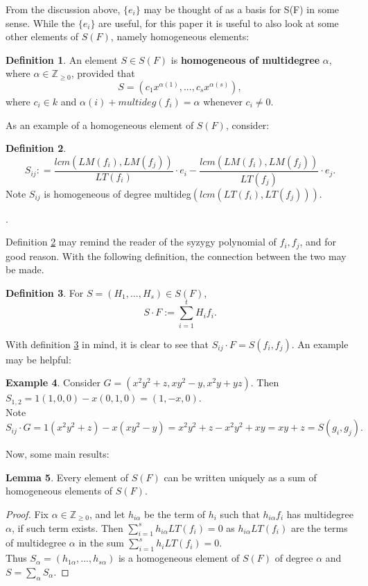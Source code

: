 \documentclass[reqno]{amsart}
\theoremstyle{definition}
\newtheorem{lem}{Lemma}
\theoremstyle{definition}
\newtheorem{defn}[lem]{Definition}
\newtheorem{ex}[lem]{Example}
\begin{document}
From the discussion above, $\{e_i\}$ may be thought of as a basis for S(F) in some sense. While the $\{e_i\}$ are useful, for this paper it is useful to also look at some other elements of $S(F)$, namely homogeneous elements: 

\begin{defn}
An element $S\in S(F)$ is \textbf{homogeneous of multidegree} $\alpha$, where $\alpha \in \mathbb{Z}_{\geq0}$, provided that $$S = (c_1x^{\alpha(1)}, ..., c_sx^{\alpha(s)}),$$ where $c_i\in k$ and $\alpha(i) + multideg(f_i) = \alpha$ whenever $c_i\neq 0$. 
\end{defn}

As an example of a homogeneous element of $S(F)$, consider: 

\begin{defn}\label{sij}
$$S_{ij} : = \frac{lcm(LM(f_i),LM(f_j))}{LT(f_i)}\cdot \textbf{$e_i$} - \frac{lcm(LM(f_i),LM(f_j))}{LT(f_j)}\cdot \textbf{$e_j$}. $$ Note $S_{ij}$ is homogeneous of degree multideg$(lcm(LT(f_i),LT(f_j)))$.
\end{defn}.

Definition \ref{sij} may remind the reader of the syzygy polynomial of $f_i,f_j$, and for good reason. With the following definition, the connection between the two may be made. 

\begin{defn}\label{sdotf}
For $S = (H_1,...,H_s)\in S(F)$, 
$$S\cdot F := \sum_{i = 1}^t H_if_i.$$
\end{defn}

With definition \ref{sdotf} in mind, it is clear to see that $S_{ij}\cdot F = S(f_i,f_j).$ An example may be helpful:

\begin{ex}
Consider $G = (x^2y^2+z,xy^2-y,x^2y+yz)$. Then
\\$S_{1,2} = 1(1,0,0) - x(0,1,0) = (1,-x,0)$. 
\\Note $S_{ij}\cdot G = 1(x^2y^2+z) - x(xy^2-y) = x^2y^2+z - x^2y^2+xy = xy + z = S(g_i,g_j).$
\end{ex}

Now, some main results: 

\begin{lem}
Every element of $S(F)$ can be written uniquely as a sum of homogeneous elements of $S(F)$. 
\end{lem}

\begin{proof}
Fix $\alpha \in \mathbb{Z}_{\geq0}$, and let $h_{i\alpha}$ be the term of $h_i$ such that $h_{i\alpha}f_i$ has multidegree $\alpha$, if such term exists. Then $\sum_{i=1}^s h_{i\alpha}LT(f_i) = 0$ as $h_{i\alpha}LT(f_i)$ are the terms of multidegree $\alpha$ in the sum $\sum_{i=1}^s h_{i}LT(f_i) = 0$.
\\Thus $S_{\alpha} = (h_{1\alpha}, ..., h_{s\alpha})$ is a homogeneous element of $S(F)$ of degree $\alpha$ and $S = \sum_{\alpha}S_{\alpha}$.
\end{proof}
\end{document}
